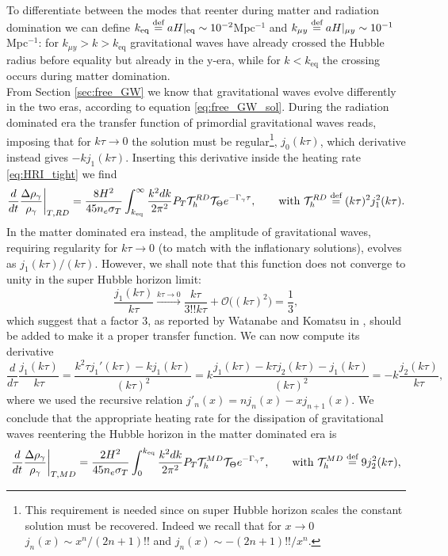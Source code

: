 To differentiate between the modes that reenter during matter and radiation domination we can define $k_\text{eq}\stackrel{\text{def}}{=} aH|_\text{eq}\sim 10^{-2}$Mpc$^{-1}$ and $k_{\mu y}\stackrel{\text{def}}{=} aH|_{\mu y}\sim 10^{-1}$Mpc$^{-1}$: for $k_{\mu y}>k>k_\text{eq}$ gravitational waves have already crossed the Hubble radius before equality but already in the y-era, while for $k<k_\text{eq}$ the crossing occurs during matter domination.\\ From Section \ref{sec:free_GW} we know that gravitational waves evolve differently in the two eras, according to equation \eqref{eq:free_GW_sol}. During the radiation dominated era the transfer function of primordial gravitational waves reads, imposing that for $k\tau\to0$ the solution must be regular\footnote{This requirement is needed since on super Hubble horizon scales the constant solution must be recovered. Indeed we recall that for $x\to0$ $j_n(x)\sim x^{n}/(2n+1)!!$ and $j_n(x)\sim -(2n+1)!!/x^{n}$.}, $ j_0(k\tau)$, which derivative
instead gives $-kj_1(k\tau)$. Inserting this derivative inside the heating rate \eqref{eq:HRI_tight} we find
\begin{equation}
    \frac{d}{dt}\frac{\Delta\rho_\gamma}{\rho_\gamma}\bigg|_{T,RD}=\frac{8H^2}{45n_e\sigma_T}\int_{k_\text{eq}}^{\infty}\frac{k^2dk}{2\pi^2}{P}_T\mathcal{T}_h^{RD}\mathcal T_\Theta e^{-\Gamma_\gamma\tau},\qquad\text{with }\mathcal{T}_h^{RD}\stackrel{\text{def}}{=} (k\tau)^2j_1^2(k\tau).
\end{equation} 
In the matter dominated era instead, the amplitude of gravitational waves, requiring regularity for $k\tau\to0$ (to match with the inflationary solutions), evolves as $j_1(k\tau)/(k\tau)$.
However, we shall note that this function does not converge to unity in the super Hubble horizon limit:
$$\frac{j_1(k\tau)}{k\tau}\xrightarrow{k\tau\to0}\frac{k\tau}{3!!k\tau}+\mathcal{O}\big((k\tau)^2\big)=\frac{1}{3},$$
which suggest that a factor $3$, as reported by Watanabe and Komatsu in \cite{Watanabe_2006}, should be added to make it a proper transfer function.  
We can now compute its derivative
$$\frac{d}{d\tau}\frac{j_1(k\tau)}{k\tau}=\frac{k^2\tau j_1'(k\tau)-kj_1(k\tau)}{(k\tau)^2}=k\frac{j_1(k\tau)-k\tau j_2(k\tau)-j_1(k\tau)}{(k\tau)^2}=-k \frac{j_2(k\tau)}{k\tau},$$
where we used the recursive relation $j'_n(x)=n j_n(x)-xj_{n+1}(x)$. We conclude that the appropriate heating rate for the dissipation of gravitational waves reentering the Hubble horizon in the matter dominated era is 
\begin{equation}
    \frac{d}{dt}\frac{\Delta\rho_\gamma}{\rho_\gamma}\bigg|_{T,MD}=\frac{2H^2}{45n_e\sigma_T}\int_0^{k_\text{eq}}\frac{k^2dk}{2\pi^2}{P}_T\mathcal{T}_h^{MD}\mathcal T_\Theta e^{-\Gamma_\gamma\tau},\qquad\text{with }\mathcal{T}_h^{MD}\stackrel{\text{def}}{=} 9j_2^2(k\tau),
\end{equation}
